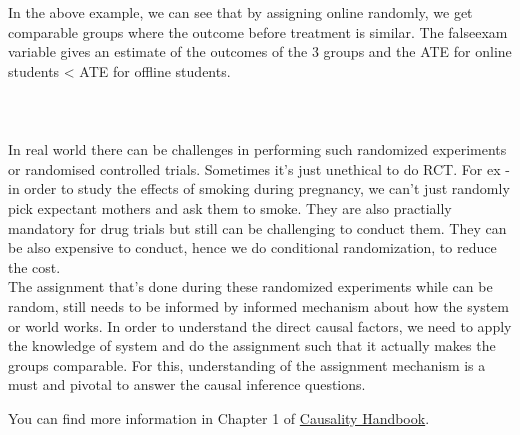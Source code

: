 \documentclass{article}
\begin{document}
In the above example, we can see that by assigning online randomly, we get comparable groups where the outcome before treatment is similar.
The falseexam variable gives an estimate of the outcomes of the 3 groups and the ATE for online students < ATE for offline students.\\\\\\\\
In real world there can be challenges in performing such randomized experiments or randomised controlled trials. Sometimes it's just
unethical to do RCT. For ex - in order to study the effects of smoking during pregnancy, we can't just randomly pick expectant mothers
and ask them to smoke. They are also practially mandatory
for drug trials but still can be challenging to conduct them. They can be also expensive to conduct, hence we do conditional randomization,
to reduce the cost.\\

The assignment that's done during these randomized experiments while can be random, still needs to be informed by informed mechanism about
how the system or world works. In order to understand the direct causal factors, we need to apply the knowledge of system and do the assignment
such that it actually makes the groups comparable. For this, understanding of the assignment mechanism is a must and pivotal to answer 
the causal inference questions.

You can find more information in Chapter 1 of \href{https://matheusfacure.github.io/python-causality-handbook/02-Randomised-Experiments.html}{Causality Handbook}.
\end{document}
